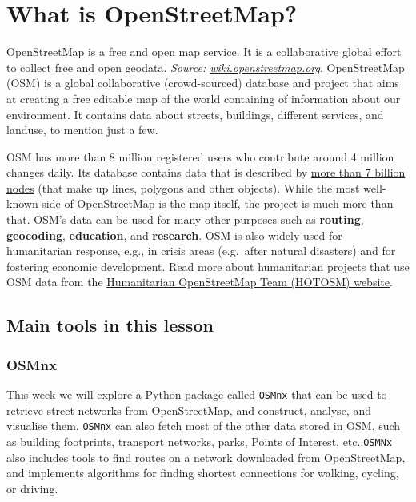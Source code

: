 \documentclass[
  letterpaper,
  DIV=11,
  numbers=noendperiod]{scrreprt}
\begin{document}
\section{What is OpenStreetMap?}\label{what-is-openstreetmap}

OpenStreetMap is a free and open map service. It is a collaborative
global effort to collect free and open geodata. \emph{Source:
\href{https://wiki.openstreetmap.org/wiki/Logos}{wiki.openstreetmap.org}}.
OpenStreetMap (OSM) is a global collaborative (crowd-sourced) database
and project that aims at creating a free editable map of the world
containing of information about our environment. It contains data about
streets, buildings, different services, and landuse, to mention just a
few.

OSM has more than 8 million registered users who contribute around 4
million changes daily. Its database contains data that is described by
\href{http://wiki.openstreetmap.org/wiki/Stats}{more than 7 billion
nodes} (that make up lines, polygons and other objects). While the most
well-known side of OpenStreetMap is the map itself, the project is much
more than that. OSM's data can be used for many other purposes such as
\textbf{routing}, \textbf{geocoding}, \textbf{education}, and
\textbf{research}. OSM is also widely used for humanitarian response,
e.g., in crisis areas (e.g.~after natural disasters) and for fostering
economic development. Read more about humanitarian projects that use OSM
data from the \href{https://www.hotosm.org}{Humanitarian OpenStreetMap
Team (HOTOSM) website}.

\subsection{Main tools in this lesson}\label{main-tools-in-this-lesson}

\subsubsection{OSMnx}\label{osmnx}

This week we will explore a Python package called
\href{https://github.com/gboeing/osmnx}{\texttt{OSMnx}} that can be used
to retrieve street networks from OpenStreetMap, and construct, analyse,
and visualise them. \texttt{OSMnx} can also fetch most of the other data
stored in OSM, such as building footprints, transport networks, parks,
Points of Interest, etc..\texttt{OSMNx} also includes tools to find
routes on a network downloaded from OpenStreetMap, and implements
algorithms for finding shortest connections for walking, cycling, or
driving.
\end{document}
